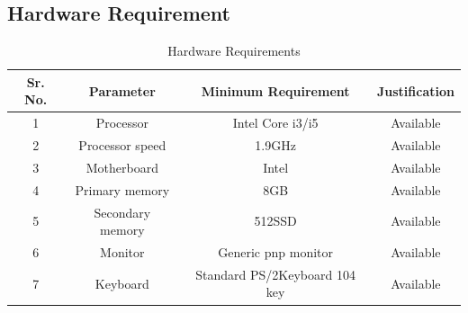 \documentclass[oneside,a4paper,12pt]{report}
\begin{document}
\begin{center}
\begin{enumerate}
\section{Hardware Requirement}
\begin{table}[!htbp]
\begin{center}
\caption {Hardware Requirements}
\label{tab:Hardware Requirements}
\def\arraystretch{1.5}
  \begin{tabular}{| c | c | c | c | }
\hline
\textbf{Sr. No.} & \textbf{Parameter} & \textbf{ Minimum Requirement} & \textbf{Justification} \\ \hline
1&	Processor&	Intel Core i3/i5&	Available\\ \hline
2&	Processor speed&	1.9GHz&	Available\\ \hline
3&	Motherboard&	Intel&	Available\\ \hline
4&	Primary memory&	8GB&	Available\\ \hline
5&	Secondary memory&	512SSD&	Available\\ \hline
6&	Monitor &	Generic pnp monitor&	Available\\ \hline
7&	Keyboard&	Standard PS/2Keyboard 104 key&	Available\\  \hline
\end{tabular}
\end{center}
\end{table}

\end{enumerate}
\end{center}
\end{document}
